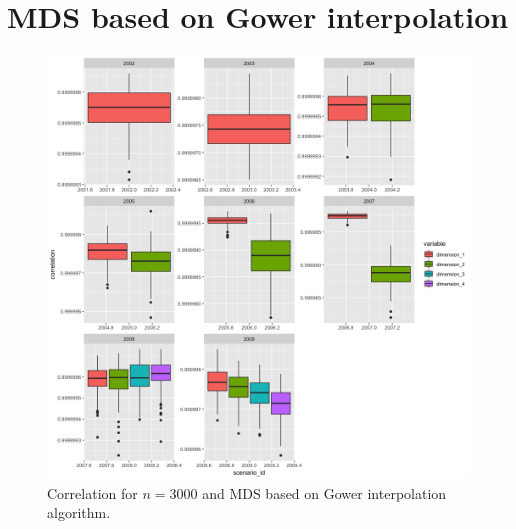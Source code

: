 \documentclass[11pt]{report}
\begin{document}
%
%
%
%

\section{MDS based on Gower interpolation}
\label{gower_corr}

\begin{figure}[ht]
\centering
    \includegraphics[scale = 1.5]{./images/gower_correlation_3000.png}
    \caption{Correlation for $n = 3000$ and MDS based on Gower interpolation algorithm.}
    \label{gower_correlation_3000}
\end{figure}
\end{document}
